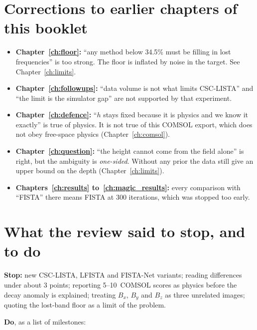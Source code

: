 \section{Corrections to earlier chapters of this booklet}

\begin{careful}
\begin{itemize}
\item \textbf{Chapter~\ref{ch:floor}:} ``any method below 34.5\% must be filling in lost frequencies'' is too strong. The
floor is inflated by noise in the target. See Chapter~\ref{ch:limits}.
\item \textbf{Chapter~\ref{ch:followups}:} ``data volume is not what limits CSC-LISTA'' and ``the limit is the simulator
gap'' are not supported by that experiment.
\item \textbf{Chapter~\ref{ch:defence}:} ``$h$ stays fixed because it is physics and we know it exactly'' is true of physics.
It is not true of this COMSOL export, which does not obey free-space physics (Chapter~\ref{ch:comsol}).
\item \textbf{Chapter~\ref{ch:question}:} ``the height cannot come from the field alone'' is right, but the ambiguity is
\emph{one-sided}. Without any prior the data still give an upper bound on the depth (Chapter~\ref{ch:limits}).
\item \textbf{Chapters~\ref{ch:results} to~\ref{ch:magic_results}:} every comparison with ``FISTA'' there means FISTA at 300
iterations, which was stopped too early.
\end{itemize}
\end{careful}

\section{What the review said to stop, and to do}

\textbf{Stop:} new CSC-LISTA, LFISTA and FISTA-Net variants; reading differences under about 3 points; reporting
5--10\um\ COMSOL scores as physics before the decay anomaly is explained; treating $B_x$, $B_y$ and $B_z$ as three
unrelated images; quoting the lost-band floor as a limit of the problem.

\textbf{Do}, as a list of milestones:

